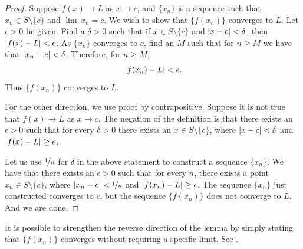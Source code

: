 \begin{proof}
Suppose 
$f(x) \to L$ as $x \to c$, and $\{ x_n \}$ is a sequence
such that
$x_n \in S \setminus \{c\}$ and
$\lim\, x_n = c$.
We wish to show that $\{ f(x_n) \}$ converges to $L$.
Let $\epsilon > 0$ be given.  Find a $\delta > 0$ such that
if $x \in S \setminus \{c\}$ and $\left\lvert {x-c} \right\rvert < \delta$, then
$\left\lvert {f(x) - L} \right\rvert < \epsilon$.  As
$\{ x_n \}$  converges to $c$, find an $M$ such that for $n \geq M$
we have that $\left\lvert {x_n - c} \right\rvert < \delta$.  Therefore, for $n \geq M$,
\begin{equation*}
\left\lvert {f(x_n) - L} \right\rvert < \epsilon .
\end{equation*}
Thus $\{ f(x_n) \}$ converges to $L$.

For the other direction, we use proof by contrapositive.  Suppose 
it is not true that $f(x) \to L$ as $x \to c$.  The negation of the
definition is that there exists an $\epsilon > 0$ such that for every
$\delta > 0$ there exists an $x \in S \setminus \{c\}$, where
$\left\lvert {x-c} \right\rvert < \delta$
and $\left\lvert {f(x)-L} \right\rvert \geq \epsilon$.

Let us use $\nicefrac{1}{n}$ for $\delta$ in the above statement to
construct a sequence $\{ x_n \}$.  We have
that there exists an $\epsilon > 0$ such that for every $n$,
there exists a point $x_n \in S \setminus \{c\}$, where
$\left\lvert {x_n-c} \right\rvert < \nicefrac{1}{n}$
and $\left\lvert {f(x_n)-L} \right\rvert \geq \epsilon$.
The sequence $\{ x_n \}$ just constructed converges to $c$, but
the sequence $\{ f(x_n) \}$ does not converge to $L$.
And we are done.
\end{proof}

It is possible to strengthen the reverse direction of
the lemma by simply stating that
$\{ f(x_n) \}$ converges without requiring a specific limit.
See .

